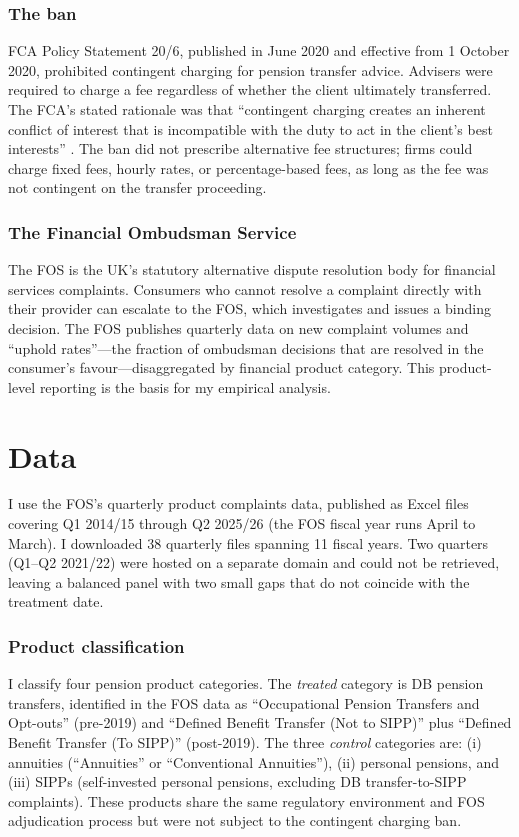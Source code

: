 \documentclass[12pt]{article}
\begin{document}
\subsubsection*{The ban} FCA Policy Statement 20/6, published in June 2020 and effective from 1 October 2020, prohibited contingent charging for pension transfer advice. Advisers were required to charge a fee regardless of whether the client ultimately transferred. The FCA's stated rationale was that ``contingent charging creates an inherent conflict of interest that is incompatible with the duty to act in the client's best interests'' \citep{fca2020ps206}. The ban did not prescribe alternative fee structures; firms could charge fixed fees, hourly rates, or percentage-based fees, as long as the fee was not contingent on the transfer proceeding.

\subsubsection*{The Financial Ombudsman Service} The FOS is the UK's statutory alternative dispute resolution body for financial services complaints. Consumers who cannot resolve a complaint directly with their provider can escalate to the FOS, which investigates and issues a binding decision. The FOS publishes quarterly data on new complaint volumes and ``uphold rates''---the fraction of ombudsman decisions that are resolved in the consumer's favour---disaggregated by financial product category. This product-level reporting is the basis for my empirical analysis.


\section{Data}

I use the FOS's quarterly product complaints data, published as Excel files covering Q1 2014/15 through Q2 2025/26 (the FOS fiscal year runs April to March). I downloaded 38 quarterly files spanning 11 fiscal years. Two quarters (Q1--Q2 2021/22) were hosted on a separate domain and could not be retrieved, leaving a balanced panel with two small gaps that do not coincide with the treatment date.

\subsubsection*{Product classification} I classify four pension product categories. The \textit{treated} category is DB pension transfers, identified in the FOS data as ``Occupational Pension Transfers and Opt-outs'' (pre-2019) and ``Defined Benefit Transfer (Not to SIPP)'' plus ``Defined Benefit Transfer (To SIPP)'' (post-2019). The three \textit{control} categories are: (i) annuities (``Annuities'' or ``Conventional Annuities''), (ii) personal pensions, and (iii) SIPPs (self-invested personal pensions, excluding DB transfer-to-SIPP complaints). These products share the same regulatory environment and FOS adjudication process but were not subject to the contingent charging ban.
\end{document}
